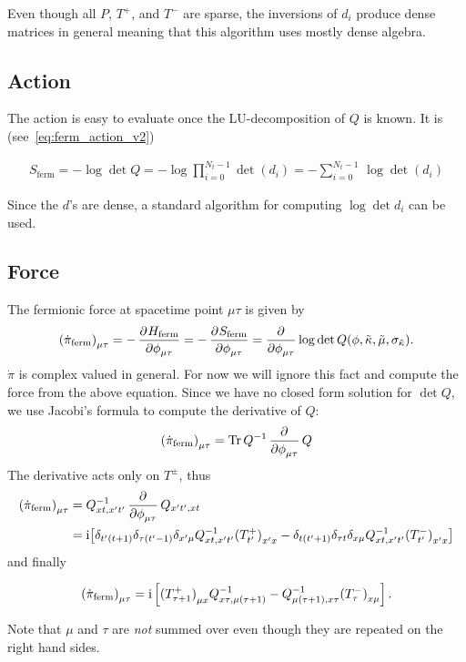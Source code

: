 \documentclass[a4paper, fleqn, twoside, notitlepage]{scrartcl}
\begin{document}
\noindent
Even though all $P$, $T^+$, and $T^-$ are sparse, the inversions of $d_i$ produce dense matrices in general meaning that this algorithm uses mostly dense algebra.

\subsection{Action}

The action is easy to evaluate once the LU-decomposition of $Q$ is known. It is (see~\eqref{eq:ferm_action_v2})
\begin{resultbox}
  \vspace{-\baselineskip}
  \begin{align}
    S_\text{ferm} = - \log \det Q = -\log \prod_{i=0}^{N_t-1} \det (d_i) = -\sum_{i=0}^{N_t-1}\, \log \det (d_i)
  \end{align}
\end{resultbox}
\noindent
Since the $d$'s are dense, a standard algorithm for computing $\log\det d_i$ can be used.

\subsection{Force}

The fermionic force at spacetime point $\mu\tau$ is given by
\begin{align}
  {(\dot{\pi}_{\text{ferm}})}_{\mu\tau} = -\dpd{H_{\text{ferm}}}{\phi_{\mu\tau}} = -\dpd{S_\text{ferm}}{\phi_{\mu\tau}} =  \dpd{}{\phi_{\mu\tau}} \log \det Q(\phi, \tilde{\kappa}, \tilde{\mu}, \sigma_{\tilde{\kappa}}).
\end{align}
$\dot{\pi}$ is complex valued in general. For now we will ignore this fact and compute the force from the above equation.
Since we have no closed form solution for $\det Q$, we use Jacobi's formula to compute the derivative of $Q$:
\begin{align}
  {(\dot{\pi}_{\text{ferm}})}_{\mu\tau} = \Tr Q^{-1} \dpd{}{\phi_{\mu\tau}} Q
\end{align}
The derivative acts only on $T^\pm$, thus
\begin{align}
  {(\dot{\pi}_{\text{ferm}})}_{\mu\tau}
  &= Q^{-1}_{xt,x't'} \dpd{}{\phi_{\mu\tau}} Q_{x't',xt}\\
  &= \i \big[\delta_{t'(t+1)}\delta_{\tau(t'-1)}\delta_{x'\mu} Q^{-1}_{xt,x't'} {(T^+_{t'})}_{x'x} - \delta_{t(t'+1)}\delta_{\tau t}\delta_{x\mu} Q^{-1}_{xt,x't'} {(T^-_{t'})}_{x'x}\big]
\end{align}
and finally
\begin{resultbox}
  \vspace{-\baselineskip}
  \begin{align}
    {(\dot{\pi}_{\text{ferm}})}_{\mu\tau} = \mathrm{i} \left[{(T^+_{\tau+1})}_{\mu x}Q^{-1}_{x\tau,\mu(\tau+1)} - Q^{-1}_{\mu(\tau+1),x\tau}{(T^-_\tau)}_{x\mu}\right].
  \end{align}
\end{resultbox}
\noindent
Note that $\mu$ and $\tau$ are \emph{not} summed over even though they are repeated on the right hand sides.
\end{document}

